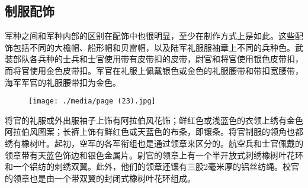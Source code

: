 \subsection{制服配饰}

军种之间和军种内部的区别在配饰中也很明显，至少在制作方式上是如此。这些配饰包括不同的大檐帽、船形帽和贝雷帽，以及陆军礼服服袖章上不同的兵种色。武装部队各兵种的士兵和士官使用带有皮带扣的皮带，尉官和将官使用银色皮带扣，而将官使用金色皮带扣。军官在礼服上佩戴银色或金色的礼服腰带和带扣宽腰带，海军军官的礼服腰带扣为金色。

\begin{figure}
\texttt{[image: ./media/page (23).jpg]}
\end{figure}

将官的礼服或外出服袖子上饰有阿拉伯风花饰；鲜红色或浅蓝色的衣领上绣有金色阿拉伯风图案；长裤上饰有鲜红色或天蓝色的布条，即镶条。将官制服的领角也都绣有橡树叶。起初，空军的各军衔组也是通过领章来区分的。航空兵和士官佩戴的领章带有天蓝色饰边和银色金属片。尉官的领章上有一个半开放式刺绣橡树叶花环和一个铝纺的刺绣双翼。此外，他们的领章还镶有三股2毫米厚的铝丝纺绳。校官的领章也是由一个带双翼的封闭式橡树叶花环组成。


